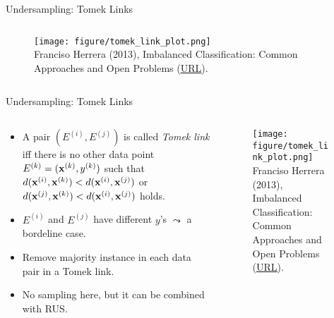 \documentclass[11pt,compress,t,notes=noshow, xcolor=table]{beamer}
\begin{document}
\begin{frame}{Undersampling: Tomek Links}
{\begin{columns}
            \begin{column}{0.4\textwidth}
                \begin{figure}
                    \centering
                    \texttt{[image: figure/tomek\_link\_plot.png]}	
                    \tiny
                    \\ Franciso Herrera (2013), Imbalanced Classification: Common
                    Approaches and Open Problems (\href{https://sci2s.ugr.es/sites/default/files/files/TutorialsAndPlenaryTalks/SSTiC-Trends in-Classification-Imbalanced-data-sets.pdf}{\underline{URL}}).
                \end{figure}
            \end{column}
        \end{columns}
   }
\end{frame}

 \begin{frame}{Undersampling: Tomek Links}

    \begin{columns}
        \begin{column}{0.59\textwidth}
            \begin{itemize} 
                
                 \item A pair $(E^{(i)},E^{(j)})$ is called \emph{Tomek link} iff there is no other data point $E^{(k)} = (\mathbf{x}^{(k)},y^{(k)})$ such that $d(\mathbf{x}^{(i)}, \mathbf{x}^{(k)}) < d(\mathbf{x}^{(i)}, \mathbf{x}^{(j)}) $ or $d(\mathbf{x}^{(j)}, \mathbf{x}^{(k)}) < d(\mathbf{x}^{(i)}, \mathbf{x}^{(j)}) $ holds.
                
                \item $E^{(i)}$ and $E^{(j)}$ have different $y$'s $\leadsto$ a bordeline case.

                \item Remove majority instance in each data pair in a Tomek link.

                \item No sampling here, but it can be combined with RUS.

            
            \end{itemize}
        \end{column}

        \begin{column}{0.4\textwidth}
            \begin{figure}
                \centering
                \texttt{[image: figure/tomek\_link\_plot.png]}	\tiny
                \\ Franciso Herrera (2013), Imbalanced Classification: Common
                Approaches and Open Problems (\href{https://sci2s.ugr.es/sites/default/files/files/TutorialsAndPlenaryTalks/SSTiC-Trends in-Classification-Imbalanced-data-sets.pdf}{\underline{URL}}).
            \end{figure}
        \end{column}
    \end{columns}

\end{frame}
	
\end{document}
